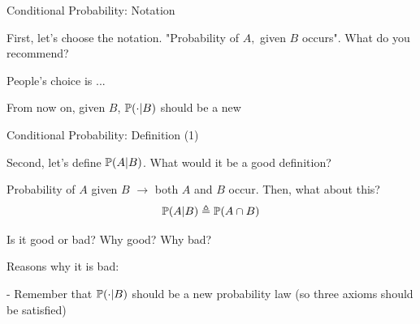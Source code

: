 \documentclass[fleqn,aspectratio=169]{beamer}
\begin{document}
\begin{frame}{Conditional Probability: Notation}

\bci

\item<1-> First, let's choose the notation. "Probability of $A,$ given $B$ occurs". What do you recommend?

\item<3-> People's choice is ... 

\item<5-> From now on, given $B$, $\mathbb{P}( \cdot | B )$ should be a new 
\eci 

\end{frame}

\begin{frame}{Conditional Probability: Definition (1)}

\plitemsep 0.1in
\bci 

\item<1-> Second, let's define $\mathbb{P}( A | B )$. What would it be a good definition?

\item<2-> Probability of $A$ given $B$ $\rightarrow$ both $A$ and $B$ occur. Then, what about this?
$$
\mathbb{P}( A | B ) \triangleq \mathbb{P}( A \cap B )
$$

\item<3-> Is it good or bad? Why good? Why bad?

\item<4-> Reasons why it is bad: 

- Remember that $\mathbb{P}( \cdot | B )$ should be a new probability law (so three axioms should be satisfied)

\medskip



\eci 

\end{frame}
\end{document}
